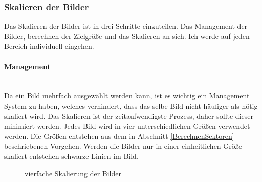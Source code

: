 \newpage

\subsubsection{Skalieren der Bilder}
Das Skalieren der Bilder ist in drei Schritte einzuteilen. Das Management der Bilder, berechnen der Zielgröße und das Skalieren an sich. Ich werde auf jeden Bereich individuell eingehen.

\paragraph{Management}\mbox{}\\
Da ein Bild mehrfach ausgewählt werden kann, ist es wichtig ein Management System zu haben, welches verhindert, dass das selbe Bild nicht häufiger als nötig skaliert wird. Das Skalieren ist der zeitaufwendigste Prozess, daher sollte dieser minimiert werden. Jedes Bild wird in vier unterschiedlichen Größen verwendet werden. Die Größen entstehen aus dem in Abschnitt \ref{BerechnenSektoren} beschriebenen Vorgehen. Werden die Bilder nur in einer einheitlichen Größe skaliert entstehen schwarze Linien im Bild.

\begin{figure}[h]
    \centering
    \caption[Schwarze Linien]{vierfache Skalierung der Bilder}
\end{figure}

